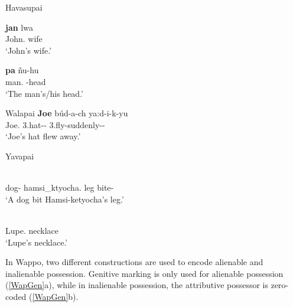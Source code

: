 \pagebreak

\begin{exe}\ex\label{HavGen} {Havasupai} \citep[57]{Kozlowski:1972}\nopagebreak[4]
\begin{xlist} 
\ex \gll \textbf{jan} lwa\\
John.\acc{} wife\\
`John's wife.' %

\ex\gll \textbf{pa} \~nu-hu\\
man.\acc{} \dem{}-head\\
`The man's/his head.' %
\end{xlist}
\end{exe}

\begin{exe}\ex\label{WalGen} {Walapai} \citep[76]{Watahomigie:2001}\nopagebreak[4]
\gll \textbf{Joe} b\'ud-a-ch ya:d-i-k-yu\\
Joe.\acc{} 3.hat--\nom{} 3.fly-suddenly-\ssbj{}-\aux{}\\
`Joe's hat flew away.'
\end{exe}

\begin{exe}\ex\label{YavGen} {Yavapai} \citep[60]{Kendall:1976}\nopagebreak[4]
\begin{xlist}\ex\gll\label{YavInal} \textbf{}  \\
dog-\nom{} hamsi\_ktyocha.\acc{} leg bite-\compl{}\\
`A dog bit Hamsi-ketyocha's leg.'

\ex\gll\label{YavAlien}\textbf{} \\
Lupe.\acc{} necklace\\
`Lupe's necklace.'
\end{xlist}
\end{exe}

In Wappo, two different constructions are used to encode alienable and inalienable possession.
Genitive marking is only used for alienable possession (\ref{WapGen}a), while in inalienable possession, the attributive possessor is zero-coded (\ref{WapGen}b).

